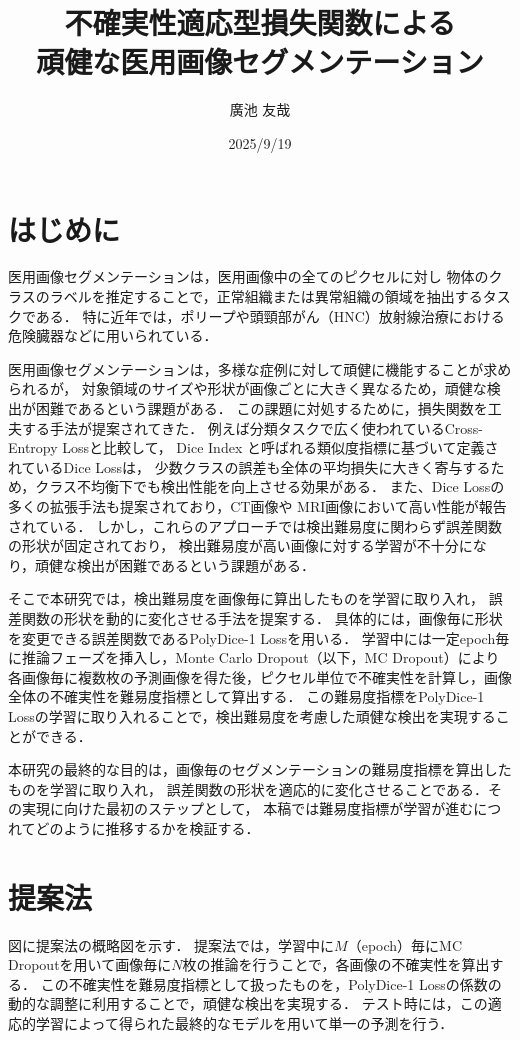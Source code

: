 \documentclass[10pt, a4paper, twocolumn]{jarticle}
\title{不確実性適応型損失関数による \\
頑健な医用画像セグメンテーション}
\author{廣池 友哉}
\affiliation{広島大学 大学院先進理工系科学研究科 情報科学プログラム}
\date{2025/9/19}
\begin{document}
\maketitle


\section{はじめに}
医用画像セグメンテーションは，医用画像中の全てのピクセルに対し
物体のクラスのラベルを推定することで，正常組織または異常組織の領域を抽出するタスクである．
特に近年では，ポリープ\cite{ji2022video}や頭頸部がん（HNC）放射線治療における危険臓器\cite{maleki2020machine}などに用いられている．

医用画像セグメンテーションは，多様な症例に対して頑健に機能することが求められるが，
対象領域のサイズや形状が画像ごとに大きく異なるため，頑健な検出が困難であるという課題がある．
この課題に対処するために，損失関数を工夫する手法が提案されてきた．
例えば分類タスクで広く使われているCross-Entropy Loss\cite{long2015fully}と比較して，
Dice Index と呼ばれる類似度指標に基づいて定義されているDice Loss\cite{milletari2016v}は，
少数クラスの誤差も全体の平均損失に大きく寄与するため，クラス不均衡下でも検出性能を向上させる効果がある．
また、Dice Lossの多くの拡張手法も提案されており，CT画像\cite{zhu2019anatomynet, 9109297}や
MRI画像\cite{KATO2024107695}において高い性能が報告されている．
しかし，これらのアプローチでは検出難易度に関わらず誤差関数の形状が固定されており，
検出難易度が高い画像に対する学習が不十分になり，頑健な検出が困難であるという課題がある．

そこで本研究では，検出難易度を画像毎に算出したものを学習に取り入れ，
誤差関数の形状を動的に変化させる手法を提案する．
具体的には，画像毎に形状を変更できる誤差関数であるPolyDice-1 Lossを用いる．
学習中には一定epoch毎に推論フェーズを挿入し，Monte Carlo Dropout\cite{pmlr-v48-gal16}（以下，MC Dropout）により
各画像毎に複数枚の予測画像を得た後，ピクセル単位で不確実性を計算し，画像全体の不確実性を難易度指標として算出する．
この難易度指標をPolyDice-1 Lossの学習に取り入れることで，検出難易度を考慮した頑健な検出を実現することができる．

本研究の最終的な目的は，画像毎のセグメンテーションの難易度指標を算出したものを学習に取り入れ，
誤差関数の形状を適応的に変化させることである．その実現に向けた最初のステップとして，
本稿では難易度指標が学習が進むにつれてどのように推移するかを検証する．

\section{提案法}
図に提案法の概略図を示す．
提案法では，学習中に$M$（epoch）毎にMC Dropoutを用いて画像毎に$N$枚の推論を行うことで，各画像の不確実性を算出する．
この不確実性を難易度指標として扱ったものを，PolyDice-1 Lossの係数の動的な調整に利用することで，頑健な検出を実現する．
テスト時には，この適応的学習によって得られた最終的なモデルを用いて単一の予測を行う．
\end{document}
